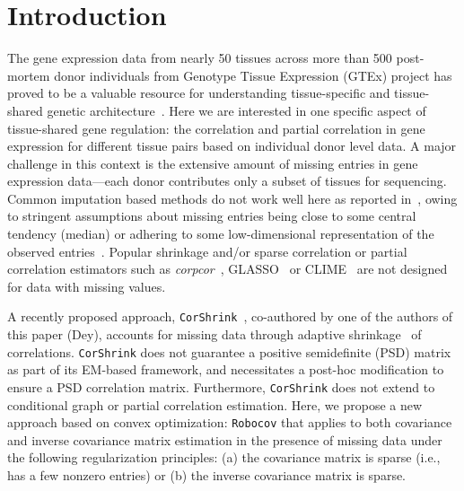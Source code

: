 \documentclass{bioinfo}
\def\CorShrink{\texttt{CorShrink}}
\def\Robocov{\texttt{Robocov}}
\begin{document}
\maketitle

\justifying
\section{Introduction}

The gene expression data from nearly 50 tissues across more than 500 post-mortem donor individuals from Genotype Tissue Expression (GTEx) project has proved to be a valuable resource for understanding tissue-specific and tissue-shared genetic architecture~\cite{gtex2015, gtex2017, dey2017, aguet2019}. Here we are interested in one specific aspect of tissue-shared gene regulation: the correlation and partial correlation in gene expression for  different tissue pairs based on individual donor level data.  A major challenge in this context is the extensive amount of missing entries in gene expression data---each donor contributes only a subset of tissues for sequencing. 
Common imputation based methods do not work well here as reported in~\cite{dey2019}, owing to stringent assumptions about missing entries being close to some central tendency (median) or adhering to some low-dimensional representation of the observed entries~\cite{mazumder2010spectral,mazumder2015}. Popular shrinkage and/or sparse correlation or partial correlation estimators such as \textit{corpcor}~\cite{ledoit2003improved, schafer2005shrinkage}, GLASSO~\cite{friedman2008} or CLIME~\cite{cai2011} are not designed for data with missing values. 

A recently proposed approach, \CorShrink{}~\cite{dey2019}, co-authored by one of the authors of this paper (Dey), accounts for missing data through adaptive shrinkage~\cite{stephens2016} of correlations. \CorShrink{} does not guarantee a positive semidefinite (PSD) matrix as part of its EM-based framework, and necessitates a post-hoc modification to ensure a PSD correlation matrix. Furthermore, \CorShrink{} does not extend to conditional graph or partial correlation estimation. Here, we propose a new approach based on convex optimization: \Robocov{} that applies to both covariance and inverse covariance matrix estimation in the presence of missing data under the following regularization principles:
(a) the covariance matrix is sparse (i.e., has a few nonzero entries) or (b) the inverse covariance matrix is sparse. 
\end{document}
